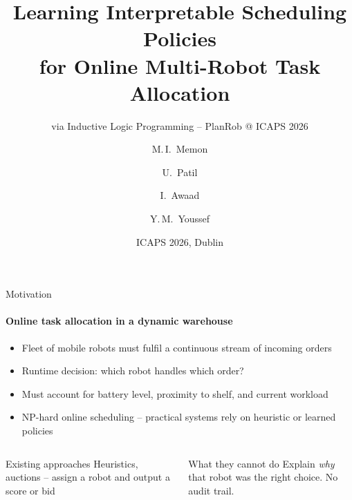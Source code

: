 \documentclass[aspectratio=169]{beamer}
\author[Memon et al.]{%
  M.\,I.\ Memon \and U.\ Patil \and I.\ Awaad \and Y.\,M.\ Youssef}
\title{Learning Interpretable Scheduling Policies\\for Online Multi-Robot Task Allocation}
\subtitle{via Inductive Logic Programming -- PlanRob @ ICAPS 2026}
\institute[H-BRS]{Hochschule Bonn-Rhein-Sieg}
\date{ICAPS 2026, Dublin}
\begin{document}
{
\begin{frame}
\titlepage
\end{frame}
}

\begin{frame}{Motivation}
  \framesubtitle{Online task allocation in a dynamic warehouse}
  \begin{itemize}
    \item Fleet of mobile robots must fulfil a continuous stream of incoming orders
    \item Runtime decision: \alert{which robot handles which order?}
    \item Must account for battery level, proximity to shelf, and current workload
    \item NP-hard online scheduling -- practical systems rely on heuristic or learned policies
  \end{itemize}
  \vspace{0.4em}
  \begin{columns}[onlytextwidth]
      \begin{exampleblock}{Existing approaches}
        Heuristics, auctions -- assign a robot and output a score or bid
      \end{exampleblock}
      \begin{alertblock}{What they cannot do}
        Explain \emph{why} that robot was the right choice. No audit trail.
      \end{alertblock}
  \end{columns}
\end{frame}
\end{document}
